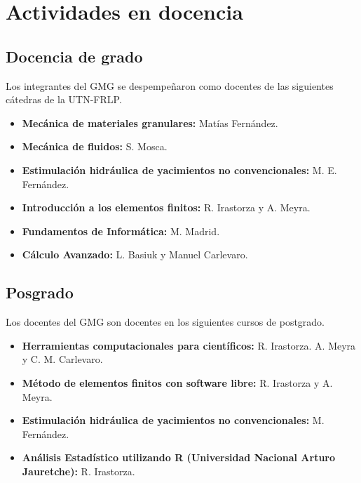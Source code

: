 \documentclass[a4paper,11pt,twoside,final,titlepage,onecolumn,openright]{report}
\begin{document}
\chapter{Actividades en docencia}

\section{Docencia de grado}

Los integrantes del GMG se despempeñaron como docentes de las siguientes cátedras de la UTN-FRLP.

\begin{itemize}
 \item {\bf Mecánica de materiales granulares:} Matías Fernández.
 \item {\bf Mecánica de fluidos:} S. Mosca.
 \item {\bf Estimulación hidráulica de yacimientos no convencionales:} M. E. Fernández.
 \item {\bf Introducción a los elementos finitos:} R. Irastorza y A. Meyra.
 \item {\bf Fundamentos de Informática:} M. Madrid.
 \item {\bf Cálculo Avanzado:} L. Basiuk y Manuel Carlevaro.
\end{itemize}




\section{Posgrado}

Los docentes del GMG son docentes en los siguientes cursos de postgrado.

\begin{itemize}
 \item {\bf Herramientas computacionales para científicos:} R. Irastorza. A. Meyra y C. M. Carlevaro.
 \item \textbf{Método de elementos finitos con software libre:} R. Irastorza y A. Meyra.
 \item \textbf{Estimulación hidráulica de yacimientos no convencionales:} M. Fernández.
 \item {\bf Análisis Estadístico utilizando R (Universidad Nacional Arturo Jauretche):} R. Irastorza.
\end{itemize}
\end{document}
